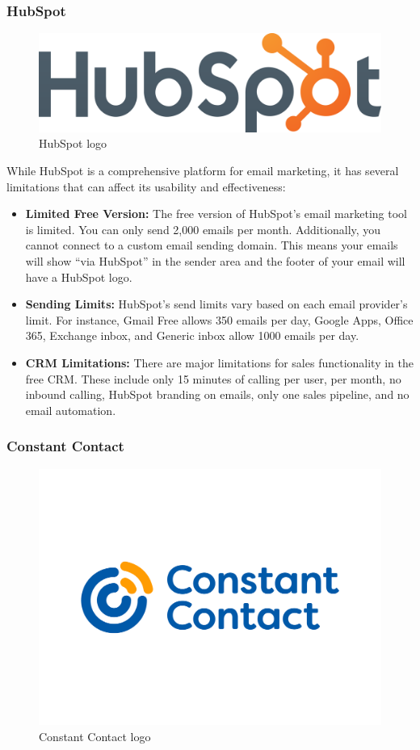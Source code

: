 \subsubsection{HubSpot}

\begin{figure}[ht]
    \centering
    \includegraphics[width=0.5\linewidth]{Images/logos/hubspot.png}
    \caption{HubSpot logo}
    \label{fig:HubSpot Logo}
\end{figure}

While HubSpot is a comprehensive platform for email marketing, it has several limitations that can affect its usability and effectiveness:

\vspace{10pt}

\begin{itemize}
\item \textbf{Limited Free Version:} The free version of HubSpot’s email marketing tool is limited. You can only send 2,000 emails per month. Additionally, you cannot connect to a custom email sending domain. This means your emails will show “via HubSpot” in the sender area and the footer of your email will have a HubSpot logo.

\item \textbf{Sending Limits:} HubSpot’s send limits vary based on each email provider’s limit. For instance, Gmail Free allows 350 emails per day, Google Apps, Office 365, Exchange inbox, and Generic inbox allow 1000 emails per day.

\item \textbf{CRM Limitations:} There are major limitations for sales functionality in the free CRM. These include only 15 minutes of calling per user, per month, no inbound calling, HubSpot branding on emails, only one sales pipeline, and no email automation.
\end{itemize}

\subsubsection{Constant Contact}

\begin{figure}[ht]
    \centering
    \includegraphics[width=0.5\linewidth]{Images/logos/Constant-Contact.png}
    \caption{Constant Contact logo}
    \label{Constant Contact Logo}
\end{figure}

